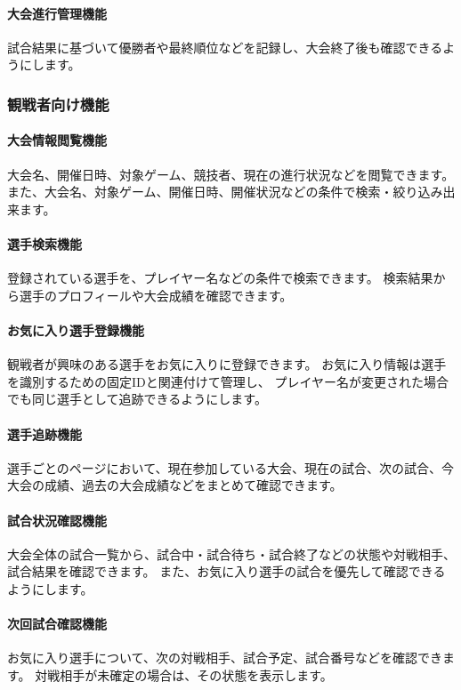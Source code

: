 \paragraph{大会進行管理機能}
試合結果に基づいて優勝者や最終順位などを記録し、大会終了後も確認できるようにします。

\subsubsection{観戦者向け機能}

\paragraph{大会情報閲覧機能}
大会名、開催日時、対象ゲーム、競技者、現在の進行状況などを閲覧できます。
また、大会名、対象ゲーム、開催日時、開催状況などの条件で検索・絞り込み出来ます。

\paragraph{選手検索機能}
登録されている選手を、プレイヤー名などの条件で検索できます。
検索結果から選手のプロフィールや大会成績を確認できます。

\paragraph{お気に入り選手登録機能}
観戦者が興味のある選手をお気に入りに登録できます。
お気に入り情報は選手を識別するための固定IDと関連付けて管理し、
プレイヤー名が変更された場合でも同じ選手として追跡できるようにします。

\paragraph{選手追跡機能}
選手ごとのページにおいて、現在参加している大会、現在の試合、次の試合、今大会の成績、過去の大会成績などをまとめて確認できます。

\paragraph{試合状況確認機能}
大会全体の試合一覧から、試合中・試合待ち・試合終了などの状態や対戦相手、試合結果を確認できます。
また、お気に入り選手の試合を優先して確認できるようにします。

\paragraph{次回試合確認機能}
お気に入り選手について、次の対戦相手、試合予定、試合番号などを確認できます。
対戦相手が未確定の場合は、その状態を表示します。

